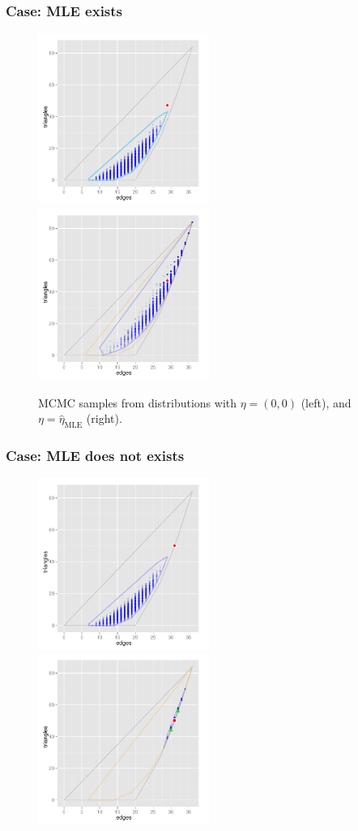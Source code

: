\documentclass[ 10pt]{beamer}
\newcommand{\etaMLE}{\hat{\eta}_{\textrm{MLE}}}
\begin{document}
\frame
{
\frametitle{Case: MLE exists}  
\begin{figure}[h]
\centering
\includegraphics[height=2.2in]{MCsample-far}
\includegraphics[height=2.2in]{MCsample-MLE}
\caption{MCMC samples from distributions with $\eta = (0,0)$ (left), and $\eta=\etaMLE$ (right).}
\label{F:MCsample-MLE exists}
\end{figure}
}


\frame
{
\frametitle{Case: MLE does not exists}  
\begin{figure}[h]
\centering
\includegraphics[height=2.2in]{MCsample-boundary}
\includegraphics[height=2.2in]{MCsample-77face}
\label{F:MCsample-MLE nonexistent}
\end{figure}
}
\end{document}

